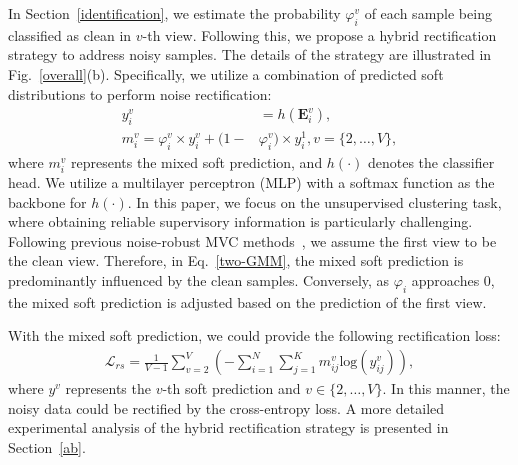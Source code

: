 \documentclass{article}
\theoremstyle{plain}
\theoremstyle{definition}
\theoremstyle{remark}
\begin{document}
In Section~\ref{identification}, we estimate the probability $\varphi_i^v$ of each sample being classified as clean in $v$-th view. Following this, we propose a hybrid rectification strategy to address noisy samples. The details of the strategy are illustrated in Fig.~\ref{overall}(b). Specifically, we utilize a combination of predicted soft distributions to perform noise rectification:
\begin{equation}
\begin{aligned}
y_i^v &= h(\textbf{E}_i^v),\\ 
m_i^v = \varphi_i^v \times y_i^v + (1 - &\varphi_i^v) \times y_i^1, v=\{2,\dots,V\},
\end{aligned}
\label{correct}
\end{equation}
where $m_i^v$ represents the mixed soft prediction, and $h(\cdot)$ denotes the classifier head. We utilize a multilayer perceptron (MLP) with a softmax function as the backbone for $h(\cdot)$. In this paper, we focus on the unsupervised clustering task, where obtaining reliable supervisory information is particularly challenging. Following previous noise-robust MVC methods~\cite{PVC, SURE, sun2024robust, MvCLN}, we assume the first view to be the clean view. Therefore, in Eq.~\eqref{two-GMM}, the mixed soft prediction is predominantly influenced by the clean samples. Conversely, as $\varphi_i$ approaches 0, the mixed soft prediction is adjusted based on the prediction of the first view.

With the mixed soft prediction, we could provide the following rectification loss:
\begin{equation}
\begin{aligned}
\mathcal{L}_{rs} =  \frac{1}{V-1}\sum_{v=2}^V\left ( -\sum_{i=1}^N\sum_{j=1}^K m_{ij}^v \text{log}\left (y_{ij}^v\right ) \right ),
\end{aligned}
\label{rectifi_loss}
\end{equation}
where $y^v$ represents the $v$-th soft prediction and $v\in\{2,\dots,V\}$. In this manner, the noisy data could be rectified by the cross-entropy loss. 
A more detailed experimental analysis of the hybrid rectification strategy is presented in Section~\ref{ab}.
\end{document}

